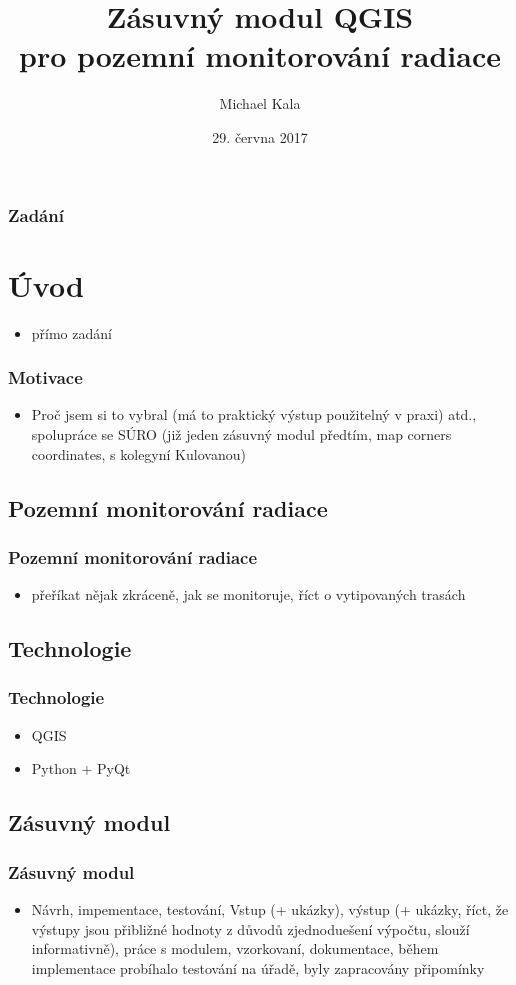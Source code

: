 \documentclass{beamer}
\title{Zásuvný modul QGIS \\ pro pozemní monitorování radiace}
\author{Michael Kala}
\date{29. června 2017}
\begin{document}
\begin{frame}
\titlepage
\end{frame}

\begin{frame}
\frametitle{Zadání}
\section{Úvod}
\begin{itemize}

\item přímo zadání

\end{itemize}
\end{frame}

\begin{frame}
\frametitle{Motivace}
\begin{itemize}
	\item Proč jsem si to vybral (má to praktický výstup použitelný v praxi) atd., spolupráce se SÚRO (již jeden zásuvný modul předtím, map corners coordinates, s kolegyní Kulovanou)
\end{itemize}
\end{frame}


\begin{frame}
\section{Pozemní monitorování radiace}
\frametitle{Pozemní monitorování radiace}
\begin{itemize}
\item přeříkat nějak zkráceně, jak se monitoruje, říct o vytipovaných trasách
\end{itemize}
\end{frame}

\begin{frame}
\section{Technologie}
\frametitle{Technologie}
\begin{itemize}
	\item QGIS
	\item Python + PyQt
\end{itemize}
\end{frame}

\begin{frame}
\section{Zásuvný modul}
\frametitle{Zásuvný modul}
\begin{itemize}
	 \item Návrh, impementace, testování, Vstup (+ ukázky), výstup (+ ukázky, říct, že výstupy jsou přibližné hodnoty z důvodů zjednoduešení výpočtu, slouží informativně), práce s modulem, vzorkovaní, dokumentace, během implementace probíhalo testování na úřadě, byly zapracovány připomínky
\end{itemize}
\end{frame}
\end{document}
